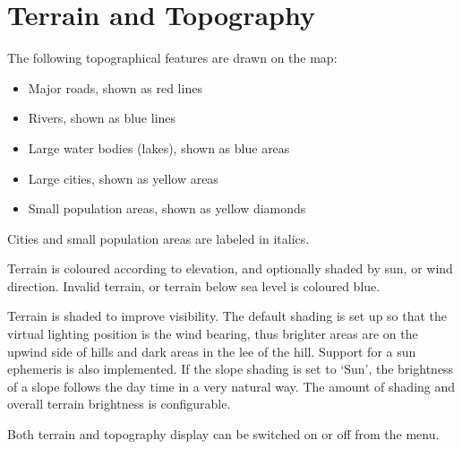\section{Terrain and Topography}\label{sec:terrain_topo}

The following topographical features are drawn on the map:
\begin{itemize}
\item Major roads, shown as red lines
\item Rivers, shown as blue lines
\item Large water bodies (lakes), shown as blue areas
\item Large cities, shown as yellow areas
\item Small population areas, shown as yellow diamonds
\end{itemize}
Cities and small population areas are labeled in italics.

Terrain is coloured according to elevation, and optionally shaded by sun, or 
wind direction.  Invalid terrain, or terrain below
sea level is coloured blue.


Terrain is shaded to improve visibility.  The default shading
is set up so that the virtual lighting position is the wind bearing,
thus brighter areas are on the upwind side of hills and dark areas in
the lee of the hill.  
Support for a sun ephemeris is also implemented. If the slope shading is set 
to `Sun', the brightness of a slope follows the day time in a very natural way.
The amount of shading and overall terrain brightness is configurable. 

Both terrain and topography display can be switched on or off from the
menu.

